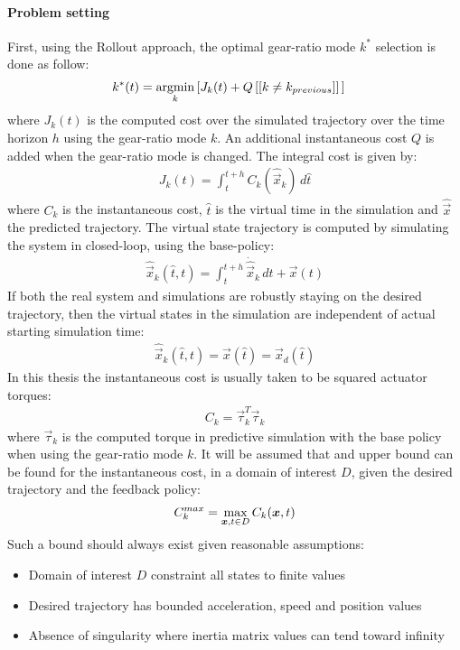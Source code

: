 \paragraph{Problem setting}
First, using the Rollout approach, the optimal gear-ratio mode $k^*$ selection is done as follow:
%
\begin{align}
k^*(t)   &= \operatornamewithlimits{argmin}\limits_{k} \left[ J_k(t) + Q \, [[ k \neq k_{previous}]] \, \right]
\label{eq:rolloutsimple}
\end{align}
%
where $J_k(t)$ is the computed cost over the simulated trajectory over the time horizon $h$ using the gear-ratio mode $k$. An additional instantaneous cost $Q$ is added when the gear-ratio mode is changed.
%
The integral cost is given by:
%
\begin{align}
J_k(t) = \int_{t}^{t+h}{  C_k( \hat{\vec{x}}_k ) \, d\hat{t} }
\end{align}
%
where $C_k$ is the instantaneous cost, $\hat{t}$ is the virtual time in the simulation and $\hat{\vec{x}}$ the predicted trajectory. The virtual state trajectory is computed by simulating the system in closed-loop, using the base-policy:
%
\begin{align}
\hat{\vec{x}}_k( \hat{t} , t ) = \int_{t}^{t+h}{  \dot{\hat{\vec{x}}}_k \, d\hat{t} } + \vec{x}(t)
\end{align}
%
If both the real system and simulations are robustly staying on the desired trajectory, then the virtual states in the simulation are independent of actual starting simulation time:
%
\begin{align}
\hat{\vec{x}}_k( \hat{t} , t ) = \vec{x}( \hat{t} ) =  \vec{x}_d( \hat{t} )
\end{align}
%
In this thesis the instantaneous cost is usually taken to be squared actuator torques:
%
\begin{align}
C_k =  \vec{\tau}_k^T \vec{\tau}_k
\end{align}
%
where $\vec{\tau}_k$ is the computed torque in predictive simulation with the base policy when using the gear-ratio mode $k$.
%
It will be assumed that and upper bound can be found for the instantaneous cost, in a domain of interest $D$, given the desired trajectory and the feedback policy:
%
\begin{align}
C_k^{max} =  \operatornamewithlimits{max}\limits_{\vec{x},t \in D} C_k(\vec{x},t)
\end{align}
%
Such a bound should always exist given reasonable assumptions: 
\begin{itemize}
	\item Domain of interest $D$ constraint all states to finite values
	\item Desired trajectory has bounded acceleration, speed and position values 
	\item Absence of singularity where inertia matrix values can tend toward infinity
\end{itemize}

